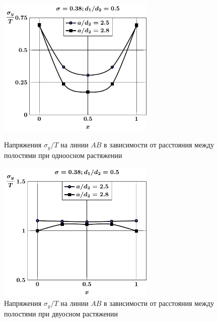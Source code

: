 \begin{figure}[h!]
\centering\footnotesize
\parbox[b]{7.5cm}{\centering\includegraphics[width=7.5cm]{periodic-oblate-cav27-a-d50-t1-sig_y.pdf}
\caption{Напряжения $\sigma_y/T$ на линии $AB$ в зависимости от расстояния между полостями при одноосном растяжении
\label{f:11:37}}}\hfil\hfil
\parbox[b]{7.5cm}{\centering\includegraphics[width=7.5cm]{periodic-oblate-cav27-a-d50-t2-sig_y.pdf}
\caption{Напряжения $\sigma_y/T$ на линии $AB$ в зависимости от расстояния между полостями при двуосном растяжении
\label{f:11:38}}}
\end{figure}

